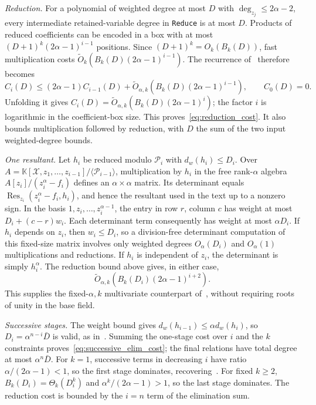 \emph{Reduction.}
For a polynomial of weighted degree at most $D$ with $\deg_{z_j}\le2\alpha-2$, every intermediate retained-variable degree in \texttt{Reduce} is at most $D$. Products of reduced coefficients can be encoded in a box with at most $(D+1)^k(2\alpha-1)^{i-1}$ positions. Since $(D+1)^k=O_k(B_k(D))$, fast multiplication costs $\widetilde O_k(B_k(D)(2\alpha-1)^{i-1})$. The recurrence of~\cite[Proposition~3 and Lemma~1]{DBLP:conf/crypto/BariantBBHOR25} therefore becomes
\[
 C_i(D)\le(2\alpha-1)C_{i-1}(D)
 +\widetilde O_{\alpha,k}\!\left(B_k(D)(2\alpha-1)^{i-1}\right),\qquad C_0(D)=0.
\]
Unfolding it gives $C_i(D)=\widetilde O_{\alpha,k}(B_k(D)(2\alpha-1)^i)$; the factor $i$ is logarithmic in the coefficient-box size. This proves~\eqref{eq:reduction_cost}. It also bounds multiplication followed by reduction, with $D$ the sum of the two input weighted-degree bounds.

\emph{One resultant.}
Let $h_i$ be reduced modulo $\mathcal P_i$ with $d_w(h_i)\le D_i$. Over $A=\mathbb K[\mathcal X,z_1,\ldots,z_{i-1}]/\langle\mathcal P_{i-1}\rangle$, multiplication by $h_i$ in the free rank-$\alpha$ algebra $A[z_i]/(z_i^\alpha-f_i)$ defines an $\alpha\times\alpha$ matrix. Its determinant equals $\operatorname{Res}_{z_i}(z_i^\alpha-f_i,h_i)$, and hence the resultant used in the text up to a nonzero sign. In the basis $1,z_i,\ldots,z_i^{\alpha-1}$, the entry in row $r$, column $c$ has weight at most $D_i+(c-r)w_i$. Each determinant term consequently has weight at most $\alpha D_i$. If $h_i$ depends on $z_i$, then $w_i\le D_i$, so a division-free determinant computation of this fixed-size matrix involves only weighted degrees $O_\alpha(D_i)$ and $O_\alpha(1)$ multiplications and reductions. If $h_i$ is independent of $z_i$, the determinant is simply $h_i^\alpha$. The reduction bound above gives, in either case,
\[
 \widetilde O_{\alpha,k}\!\left(B_k(D_i)(2\alpha-1)^{i+2}\right).
\]
This supplies the fixed-$\alpha,k$ multivariate counterpart of~\cite[Lemma~2]{DBLP:conf/crypto/BariantBBHOR25}, without requiring roots of unity in the base field.

\emph{Successive stages.}
The weight bound gives $d_w(h_{i-1})\le\alpha d_w(h_i)$, so $D_i=\alpha^{n-i}\bar D$ is valid, as in~\cite[Lemma~3]{DBLP:conf/crypto/BariantBBHOR25}. Summing the one-stage cost over $i$ and the $k$ constraints proves~\eqref{eq:successive_elim_cost}; the final relations have total degree at most $\alpha^n\bar D$. For $k=1$, successive terms in decreasing $i$ have ratio $\alpha/(2\alpha-1)<1$, so the first stage dominates, recovering~\cite[Proposition~7]{DBLP:conf/crypto/BariantBBHOR25}. For fixed $k\ge2$, $B_k(D_i)=\Theta_k(D_i^k)$ and $\alpha^k/(2\alpha-1)>1$, so the last stage dominates. The reduction cost is bounded by the $i=n$ term of the elimination sum.

